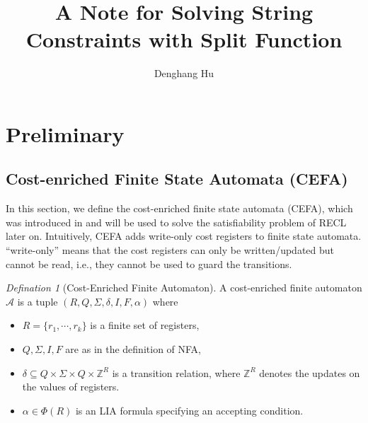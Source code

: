 \documentclass[12pt]{article}
\title{A Note for Solving String Constraints with Split Function}
\author{Denghang Hu}
\newcommand*{\aut}{\mathcal{A}}
\newcommand*{\Int}{\mathbb{Z}}
\newcommand*{\myvec}[1]{\vec{#1}}
\theoremstyle{remark}
\newtheorem{definition}{Defination}[section]
\begin{document}
\maketitle

\section{Preliminary}
\subsection{Cost-enriched Finite State Automata (CEFA)}
In this section, we define the cost-enriched finite state automata (CEFA), which was introduced in \cite{atva2020} and will be used to solve the satisfiability problem of RECL later on. 
%
Intuitively, CEFA adds write-only cost registers to finite state automata. ``write-only'' means that the cost registers can only be written/updated but cannot be read, i.e., they cannot be used to guard the transitions. 

%
\vspace{-0.5mm}
\begin{definition}[Cost-Enriched Finite Automaton]
    A cost-enriched finite automaton $\aut$ is a tuple $(R, Q, \Sigma, \delta, I, F, \alpha)$ where
    \begin{itemize}
        \item $R = \{r_1, \cdots, r_k\}$ is a finite set of registers,
        \item $Q, \Sigma, I, F$ are as in the definition of NFA,
        \item $\delta \subseteq Q \times \Sigma \times Q \times \Int^R$ is a transition relation, where $\Int^R$ denotes the updates on the values of registers.
        \item $\alpha \in \Phi(R)$ is an LIA formula specifying an accepting condition.
    \end{itemize}
\end{definition}
\vspace{-0.5mm}
\end{document}
